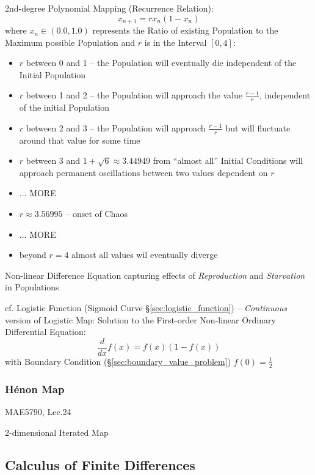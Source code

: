 2nd-degree Polynomial Mapping (Recurrence Relation):
\[
  x_{n+1} = rx_n(1-x_n)
\]
where $x_n \in (0.0, 1.0)$ represents the Ratio of existing Population to the
Maximum possible Population and $r$ is in the Interval $[0,4]$:
\begin{itemize}
  \item $r$ between 0 and 1 -- the Population will eventually die independent of
    the Initial Population
  \item $r$ between 1 and 2 -- the Population will approach the value
    $\frac{r-1}{r}$, independent of the initial Population
  \item $r$ between 2 and 3 -- the Population will approach $\frac{r-1}{r}$ but
    will fluctuate around that value for some time
  \item $r$ between 3 and $1 + \sqrt{6} \approx 3.44949$ from ``almost all''
    Initial Conditions will approach permanent oscillations between two values
    dependent on $r$
  \item ... MORE
  \item $r \approx 3.56995$ -- onset of Chaos
  \item ... MORE
  \item beyond $r=4$ almost all values wil eventually diverge
\end{itemize}

Non-linear Difference Equation capturing effects of \emph{Reproduction} and
\emph{Starvation} in Populations

\fist cf. Logistic Function (Sigmoid Curve \S\ref{sec:logistic_function}) --
\emph{Continuous} version of Logistic Map: Solution to the First-order
Non-linear Ordinary Differential Equation:
\[
  \frac{d}{dx}f(x) = f(x)(1 - f(x))
\]
with Boundary Condition (\S\ref{sec:boundary_value_problem}) $f(0) =
\frac{1}{2}$



\subsubsection{H\'enon Map}\label{sec:henon_map}

MAE5790, Lec.24

2-dimensional Iterated Map



\subsection{Calculus of Finite Differences}
\label{sec:finite_differences_calculus}

